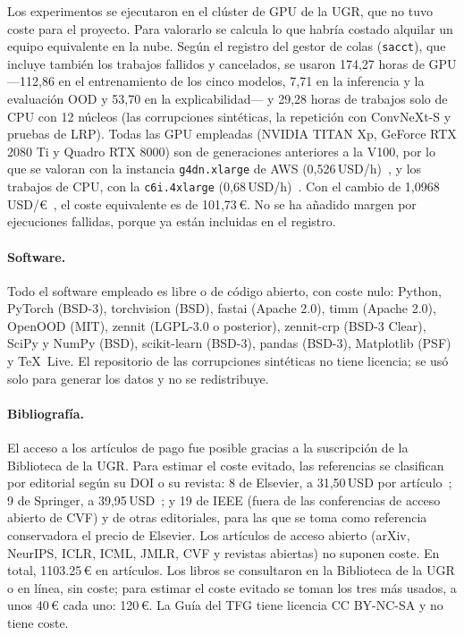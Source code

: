 Los experimentos se ejecutaron en el clúster de GPU de la UGR, que no tuvo coste para el proyecto. Para valorarlo se calcula lo que habría costado alquilar un equipo equivalente en la nube. Según el registro del gestor de colas (\texttt{sacct}), que incluye también los trabajos fallidos y cancelados, se usaron 174,27 horas de GPU ---112,86 en el entrenamiento de los cinco modelos, 7,71 en la inferencia y la evaluación OOD y 53,70 en la explicabilidad--- y 29,28 horas de trabajos solo de CPU con 12 núcleos (las corrupciones sintéticas, la repetición con ConvNeXt-S y pruebas de LRP). Todas las GPU empleadas (NVIDIA TITAN Xp, GeForce RTX 2080 Ti y Quadro RTX 8000) son de generaciones anteriores a la V100, por lo que se valoran con la instancia \texttt{g4dn.xlarge} de AWS (0,526\,USD/h)~\cite{precioawsg4dn}, y los trabajos de CPU, con la \texttt{c6i.4xlarge} (0,68\,USD/h)~\cite{precioawsc6i}. Con el cambio de 1,0968\,USD/€~\cite{cambiobde2026}, el coste equivalente es de 101,73\,€. No se ha añadido margen por ejecuciones fallidas, porque ya están incluidas en el registro.

\paragraph{Software.} Todo el software empleado es libre o de código abierto, con coste nulo: Python, PyTorch (BSD-3), torchvision (BSD), fastai (Apache 2.0), timm (Apache 2.0), OpenOOD (MIT), zennit (LGPL-3.0 o posterior), zennit-crp (BSD-3 Clear), SciPy y NumPy (BSD), scikit-learn (BSD-3), pandas (BSD-3), Matplotlib (PSF) y \TeX~Live. El repositorio de las corrupciones sintéticas no tiene licencia; se usó solo para generar los datos y no se redistribuye.

\paragraph{Bibliografía.} El acceso a los artículos de pago fue posible gracias a la suscripción de la Biblioteca de la UGR. Para estimar el coste evitado, las referencias se clasifican por editorial según su DOI o su revista: 8 de Elsevier, a 31,50\,USD por artículo~\cite{precioelsevier2026}; 9 de Springer, a 39,95\,USD~\cite{preciospringer2026}; y 19 de IEEE (fuera de las conferencias de acceso abierto de CVF) y de otras editoriales, para las que se toma como referencia conservadora el precio de Elsevier. Los artículos de acceso abierto (arXiv, NeurIPS, ICLR, ICML, JMLR, CVF y revistas abiertas) no suponen coste. En total, \num{1103,25}\,€ en artículos. Los libros se consultaron en la Biblioteca de la UGR o en línea, sin coste; para estimar el coste evitado se toman los tres más usados, a unos 40\,€ cada uno: 120\,€. La Guía del TFG tiene licencia CC BY-NC-SA y no tiene coste.

